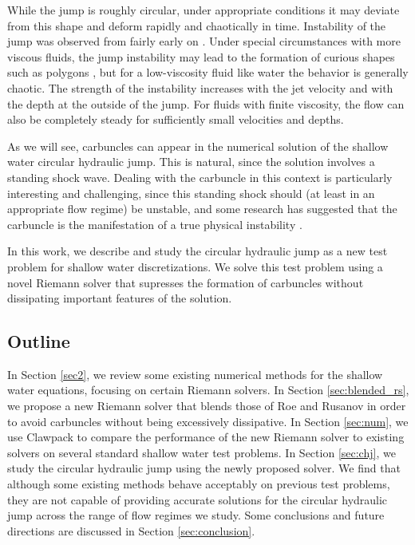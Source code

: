 \documentclass[preprint, 11pt]{article}
\begin{document}
While the jump is roughly circular, under appropriate conditions it may deviate
from this shape and deform rapidly and chaotically in time.
Instability of the jump was observed from fairly early on \cite{craik1981circular}.
Under special circumstances with more viscous fluids, the jump instability may lead to
the formation of curious shapes such as polygons \cite{ellegaard1998creating}, but
for a low-viscosity fluid like water the behavior is generally chaotic.
The strength of the instability increases with the jet velocity and with the
depth at the outside of the jump.  For fluids with finite viscosity, the flow
can also be completely steady for sufficiently small velocities and depths.


As we will see, carbuncles can appear in the numerical solution of the shallow
water circular hydraulic jump.  This is natural, since the solution involves a
standing shock wave.  Dealing with the carbuncle in this context is particularly
interesting and challenging, since this standing shock should (at least in an
appropriate flow regime) be unstable, and some research has suggested that the
carbuncle is the manifestation of a true physical
instability \cite{moschetta2001carbuncle,elling2009carbuncle}.

In this work, we describe and study the circular hydraulic jump as a new
test problem for shallow water discretizations.
We solve this test problem using a novel Riemann solver that supresses the 
formation of carbuncles without dissipating important features of the solution. 

\subsection{Outline}
In Section \ref{sec2}, we review some existing numerical methods for
the shallow water equations, focusing on certain Riemann solvers.
In Section \ref{sec:blended_rs}, we propose a new Riemann solver that blends
those of Roe and Rusanov in order to avoid carbuncles without being
excessively dissipative.  In Section \ref{sec:num}, we use Clawpack to
compare the performance of the new Riemann solver to existing
solvers on several standard shallow water test problems.  In Section \ref{sec:chj}, we
study the circular hydraulic jump using the newly proposed solver.
We find that although some
existing methods behave acceptably on previous test problems, they
are not capable of providing accurate solutions for the circular hydraulic jump
across the range of flow regimes we study.
Some conclusions and future directions are discussed in Section \ref{sec:conclusion}.
\end{document}
